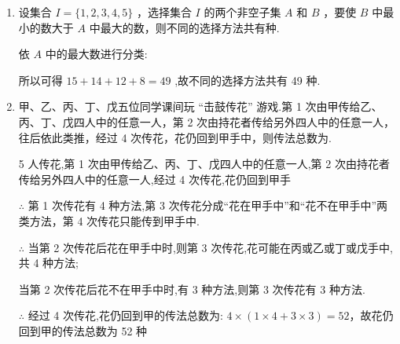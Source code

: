 \begin{enumerate}
    \item 设集合 $I = \{ 1,2,3,4,5\}$ ，选择集合 $I$ 的两个非空子集 $A$ 和 $B$ ，要使 $B$ 中最小的数大于 $A$ 中最大的数，则不同的选择方法共有种.
    \begin{jieda}
        依 $A$ 中的最大数进行分类:
        所以可得 ${15} + {14} + {12} + 8 = {49}$ ,故不同的选择方法共有 49 种.
    \end{jieda}

    \item 甲、乙、丙、丁、戊五位同学课间玩 “击鼓传花” 游戏.第 1 次由甲传给乙、 丙、丁、戊四人中的任意一人，第 2 次由持花者传给另外四人中的任意一人，往后依此类推，经过 4 次传花，花仍回到甲手中，则传法总数为.
    \begin{jieda}
        5 人传花,第 1 次由甲传给乙、丙、丁、戊四人中的任意一人,第 2 次由持花者传给另外四人中的任意一人,经过 4 次传花,花仍回到甲手
        
        $\therefore$ 第 1 次传花有 4 种方法,第 3 次传花分成“花在甲手中”和“花不在甲手中”两类方法，第 4 次传花只能传到甲手中.
        
        $\therefore$ 当第 2 次传花后花在甲手中时,则第 3 次传花,花可能在丙或乙或丁或戊手中,共 4 种方法;
        
        当第 2 次传花后花不在甲手中时,有 3 种方法,则第 3 次传花有 3 种方法.
        
        $\therefore$ 经过 4 次传花,花仍回到甲的传法总数为: $4 \times  \left( {1 \times  4 + 3 \times  3}\right)  = {52}$，故花仍回到甲的传法总数为 52 种
    \end{jieda}
\end{enumerate}

\clearpage
